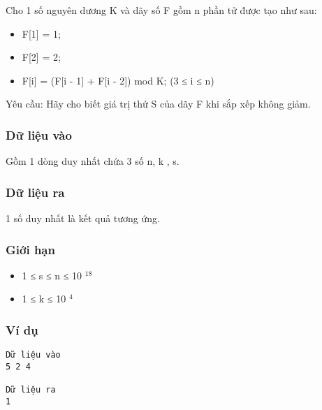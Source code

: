 



   Cho 1 số nguyên dương K và dãy số F gồm n phần tử được tạo như sau:  
\begin{itemize}
	\item     F[1] = 1;   
	\item     F[2] = 2;   
	\item     F[i] = (F[i - 1] + F[i - 2]) mod K; (3 ≤ i ≤ n)   
\end{itemize}

       Yêu cầu:      Hãy cho biết giá trị thứ S của dãy F khi sắp xếp không giảm.  

\subsubsection{   Dữ liệu vào  }

   Gồm 1 dòng duy nhất chứa 3 số n, k , s.  

\subsubsection{   Dữ liệu ra  }

   1 số duy nhất là kết quả tương ứng.  

\subsubsection{   Giới hạn  }
\begin{itemize}
	\item     1 ≤ s ≤ n ≤ 10    $^     18    $
	\item     1 ≤ k ≤ 10    $^     4    $
\end{itemize}

\subsubsection{   Ví dụ  }
\begin{verbatim}
Dữ liệu vào
5 2 4

Dữ liệu ra
1
\end{verbatim}